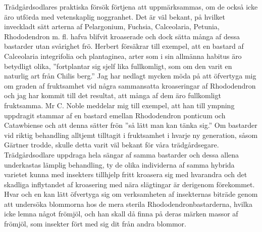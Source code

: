 Trädgårdsodlares praktiska försök förtjena att uppmärksammas, om de också icke äro utförda med vetenskaplig noggranhet. Det är väl bekant, på hvilket inveckladt sätt arterna af Pelargonium, Fuchsia, Calceolaria, Petunia, Rhododendron m. fl. hafva blifvit kroaserade och dock sätta många af dessa bastarder utan svårighet frö. Herbert försäkrar till exempel, att en bastard af Calceolaria integrifolia och plantaginea, arter som i sin allmänna habitus äro betydligt olika, ”fortplantar sig sjelf lika fullkomligt, som om den varit en naturlig art från Chilis berg.” Jag har nedlagt mycken möda på att öfvertyga mig om graden af fruktsamhet vid några sammansatta kroaseringar af Rhododendron och jag har kommit till det resultat, att många af dem äro fullkomligt fruktsamma. Mr C. Noble meddelar mig till exempel, att han till ympning uppdragit stammar af en bastard emellan Rhododendron ponticum och Catawbiense och att denna sätter frön ”så lätt man kan tänka sig.” Om bastarder vid riktig behandling alltjemt tilltagit i fruktsamhet i hvarje ny generation, såsom Gärtner trodde, skulle detta varit väl bekant för våra trädgårdsegare. Trädgårdsodlare uppdraga hela sängar af samma bastarder och dessa allena underkastas lämplig behandling, ty de olika individerna af samma hybrida varietet kunna med insekters tillhjelp fritt kroasera sig med hvarandra och det skadliga inflytandet af kroasering med nära slägtingar är derigenom förekommet. Hvar och en kan lätt öfvertyga sig om verksamheten af insekternas biträde genom att undersöka blommorna hos de mera sterila Rhododendronbastarderna, hvilka icke lemna något frömjöl, och han skall då finna på deras märken massor af frömjöl, som insekter fört med sig dit från andra blommor.

